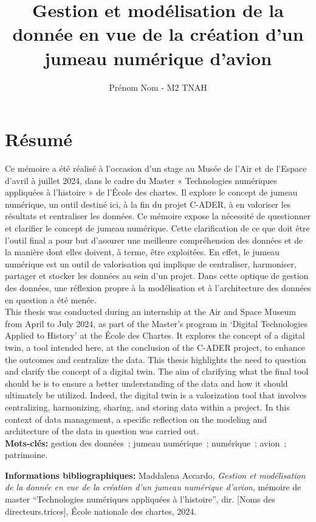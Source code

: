 \documentclass[a4paper,12pt,twoside]{book}
\title{Gestion et modélisation de la donnée en vue de la création d’un jumeau numérique d’avion}
\author{Prénom Nom - M2 TNAH}
\newcommand{\clearemptydoublepage}{\newpage{\pagestyle{empty}\cleardoublepage}}
\newcommand\mychapter[1]{%
  \chapter*{#1}%
  \markright{\MakeUppercase{#1}}%
}
\begin{document}
\onehalfspacing 

\frontmatter



\clearemptydoublepage

\frontmatter

\mychapter{Résumé}
Ce mémoire a été réalisé à l’occasion d’un stage au Musée de l'Air et de l'Espace d'avril à juillet 2024, dans le cadre du Master « Technologies numériques appliquées à l’histoire » de l’École des chartes. Il explore le concept de jumeau numérique, un outil destiné ici, à la fin du projet C-ADER, à en valoriser les résultats et centraliser les données. Ce mémoire expose la nécessité de questionner et clarifier le concept de jumeau numérique. Cette clarification de ce que doit être l'outil final a pour but d'assurer une meilleure compréhension des données et de la manière dont elles doivent, à terme, être exploitées. En effet, le jumeau numérique est un outil de valorisation qui implique de centraliser, harmoniser, partager et stocker les données au sein d'un projet. Dans cette optique de gestion des données, une réflexion propre à la modélisation et à l'architecture des données en question a été menée.\\

This thesis was conducted during an internship at the Air and Space Museum from April to July 2024, as part of the Master’s program in ‘Digital Technologies Applied to History’ at the École des Chartes. It explores the concept of a digital twin, a tool intended here, at the conclusion of the C-ADER project, to enhance the outcomes and centralize the data. This thesis highlights the need to question and clarify the concept of a digital twin. The aim of clarifying what the final tool should be is to ensure a better understanding of the data and how it should ultimately be utilized. Indeed, the digital twin is a valorization tool that involves centralizing, harmonizing, sharing, and storing data within a project. In this context of data management, a specific reflection on the modeling and architecture of the data in question was carried out.\\

\textbf{Mots-clés:} gestion des données~; jumeau numérique~; numérique~; avion~; patrimoine.

\textbf{Informations bibliographiques:} Maddalena Accardo, \textit{Gestion et modélisation de la donnée en vue de la création d’un jumeau numérique d’avion}, mémoire de master \enquote{Technologies numériques appliquées à l'histoire}, dir. [Noms des directeurs.trices], École nationale des chartes, 2024.
\end{document}
